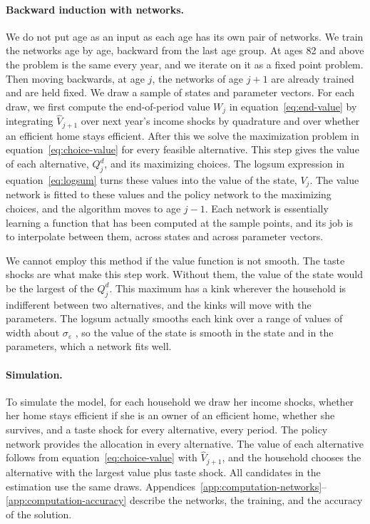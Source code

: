 \paragraph{Backward induction with networks.}
We do not put age as an input as each age has its own pair of networks. We train the networks age by age, backward from the last age group. At ages
82 and above the problem is the same every year, and we iterate on it as a fixed point problem. Then moving backwards, at age $j$, the networks of age $j+1$ are
already trained and are held fixed. We draw a sample of states and
parameter vectors. For each draw, we first compute the end-of-period value $W_j$
in equation~\eqref{eq:end-value} by integrating $\widehat V_{j+1}$ over next
year's income shocks by quadrature and over whether an efficient home stays
efficient. After this we solve the maximization problem in
equation~\eqref{eq:choice-value}  for every feasible
alternative. This step gives the value of each alternative, $Q_j^d$, and its
maximizing choices. The logsum expression in equation~\eqref{eq:logsum} turns these
values into the value of the state, $V_j$. The value network is fitted to
these values and the policy network to the maximizing choices, and the
algorithm moves to age $j-1$. Each network is essentially learning a function that has
been computed at the sample points, and its job is to interpolate between
them, across states and across parameter vectors.

We cannot employ this method if the value function is not smooth. The taste shocks are what make this step work. Without them, the value of
the state would be the largest of the $Q_j^d$. This maximum has a kink
wherever the household is indifferent between two alternatives, and the
kinks will move with the parameters. The logsum actually smooths each kink over a range
of values of width about $\sigma_\varepsilon$ \citep{iskhakov2017endogenous}, so the value of the state is
smooth in the state and in the parameters, which a network fits well.





\paragraph{Simulation.}
To simulate the model, for each household we draw her income shocks, whether her
home stays efficient if she is an owner of an efficient home, whether she survives, and a taste shock for every
alternative, every period. The policy network provides the allocation in every
alternative. The value of each alternative follows from
equation~\eqref{eq:choice-value} with $\widehat V_{j+1}$, and the household
chooses the alternative with the largest value plus taste shock. All
candidates in the estimation use the same draws.
 Appendices~\ref{app:computation-networks}--\ref{app:computation-accuracy} describe the networks, the training, and
the accuracy of the solution.

